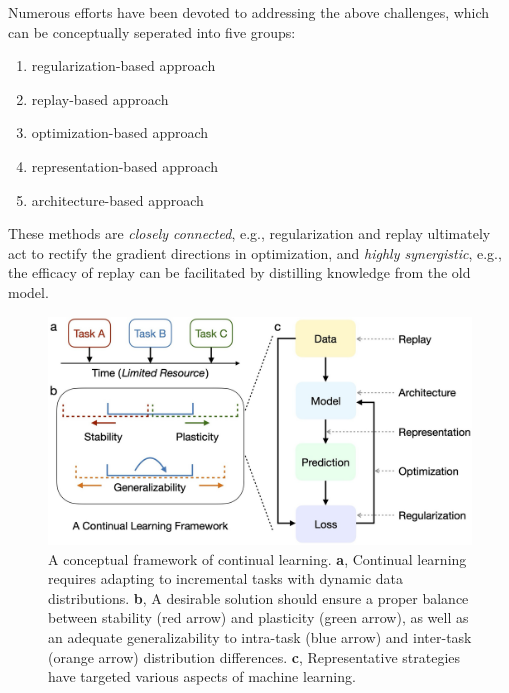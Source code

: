 \documentclass[9pt,dvipsnames]{beamer}
\begin{document}
\begin{frame}
    Numerous efforts have been devoted to addressing the above challenges, which can be conceptually seperated into five groups:
    \begin{enumerate}
        \item regularization-based approach
        \item replay-based approach
        \item optimization-based approach
        \item representation-based approach
        \item architecture-based approach
    \end{enumerate}
    These methods are \textit{closely connected}, e.g., regularization and replay ultimately act to rectify the gradient directions in optimization, and \textit{highly synergistic}, e.g., the efficacy of replay can be facilitated by distilling knowledge from the old model.
\end{frame}
\begin{frame}
    \begin{figure}[ht]
        \centering
        \includegraphics[width=0.5\linewidth]{imgs/cl_1.png}
        \caption{A conceptual framework of continual learning. \textbf{a}, Continual learning requires adapting to incremental tasks with dynamic data distributions. \textbf{b}, A desirable solution should ensure a proper balance between stability (red arrow) and plasticity (green arrow), as well as an adequate generalizability to intra-task (blue arrow) and inter-task (orange arrow) distribution differences. \textbf{c}, Representative strategies have targeted various aspects of machine learning.}
    \end{figure}
\end{frame}
\end{document}
